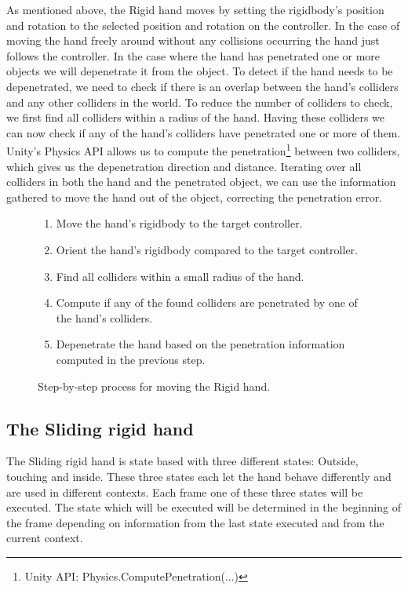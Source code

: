 As mentioned above, the Rigid hand moves by setting the rigidbody's position and rotation to the selected position and rotation on the controller. In the case of moving the hand freely around without any collisions occurring the hand just follows the controller. In the case where the hand has penetrated one or more objects we will depenetrate it from the object. To detect if the hand needs to be depenetrated, we need to check if there is an overlap between the hand's colliders and any other colliders in the world. To reduce the number of colliders to check, we first find all colliders within a radius of the hand. Having these colliders we can now check if any of the hand's colliders have penetrated one or more of them. Unity's Physics API allows us to compute the penetration\footnote{Unity API: Physics.ComputePenetration(...)} between two colliders, which gives us the depenetration direction and distance. Iterating over all colliders in both the hand and the penetrated object, we can use the information gathered to move the hand out of the object, correcting the penetration error.

\begin{figure}[H]
\centering
\small
\begin{enumerate}
\item Move the hand's rigidbody to the target controller.
\item Orient the hand's rigidbody compared to the target controller.
\item Find all colliders within a small radius of the hand.
\item Compute if any of the found colliders are penetrated by one of the hand's colliders.
\item Depenetrate the hand based on the penetration information computed in the previous step.
\end{enumerate}
\caption{Step-by-step process for moving the Rigid hand.}
\label{fig:stepByStepRigidHand}
\end{figure}

\subsection{The Sliding rigid hand}
\label{subsec:slidingRigidHand}
The Sliding rigid hand is state based with three different states: Outside, touching and inside. These three states each let the hand behave differently and are used in different contexts. Each frame one of these three states will be executed. The state which will be executed will be determined in the beginning of the frame depending on information from the last state executed and from the current context.

